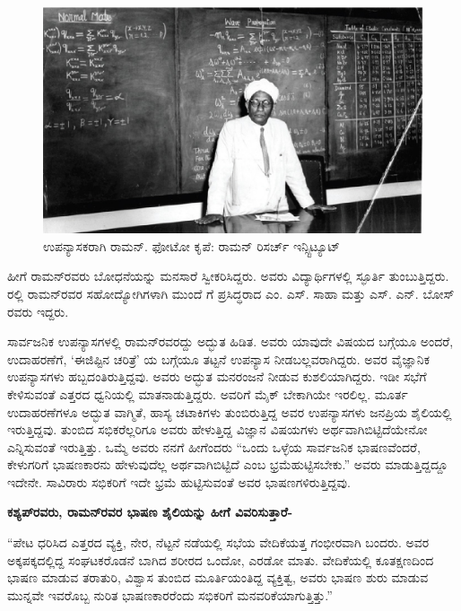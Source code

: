 \begin{figure}
\includegraphics{"images/14.jpg"}
\caption{ಉಪನ್ಯಾಸಕರಾಗಿ ರಾಮನ್. ಫೋಟೋ ಕೃಪೆ: ರಾಮನ್‌ ರಿಸರ್ಚ್ ಇನ್ಸ್ಟಿಟ್ಯೂಟ್}
\end{figure}

ಹೀಗೆ ರಾಮನ್‍ರವರು ಬೋಧನೆಯನ್ನು ಮನಸಾರೆ ಸ್ವೀಕರಿಸಿದ್ದರು. ಅವರು ವಿದ್ಯಾರ್ಥಿಗಳಲ್ಲಿ ಸ್ಫೂರ್ತಿ ತುಂಬುತ್ತಿದ್ದರು. ರಲ್ಲಿ ರಾಮನ್‍ರವರ ಸಹೋದ್ಯೋಗಿಗಳಾಗಿ ಮುಂದೆ  ಗೆ ಪ್ರಸಿದ್ಧರಾದ ಎಂ. ಎಸ್. ಸಾಹಾ ಮತ್ತು ಎಸ್. ಎನ್. ಬೋಸ್ ರವರು ಇದ್ದರು.



ಸಾರ್ವಜನಿಕ ಉಪನ್ಯಾಸಗಳಲ್ಲಿ ರಾಮನ್‍ರವರದ್ದು ಅದ್ಭುತ ಹಿಡಿತ. ಅವರು ಯಾವುದೇ ವಿಷಯದ ಬಗ್ಗೆಯೂ ಅಂದರೆ, ಉದಾಹರಣೆಗೆ, ‘ಈಜಿಪ್ಟಿನ ಚರಿತ್ರೆ’ ಯ ಬಗ್ಗೆಯೂ ತಟ್ಟನೆ ಉಪನ್ಯಾಸ ನೀಡಬಲ್ಲವರಾಗಿದ್ದರು. ಅವರ ವೈಜ್ಞಾನಿಕ ಉಪನ್ಯಾಸಗಳು ಹಬ್ಬದಂತಿರುತ್ತಿದ್ದವು. ಅವರು ಅದ್ಭುತ ಮನರಂಜನೆ ನೀಡುವ ಕುಶಲಿಯಾಗಿದ್ದರು. ಇಡೀ ಸಭೆಗೆ ಕೇಳಿಸುವಂತೆ ಎತ್ತರದ ಧ್ವನಿಯಲ್ಲಿ ಮಾತನಾಡುತ್ತಿದ್ದರು. ಅವರಿಗೆ ಮೈಕ್ ಬೇಕಾಗಿಯೇ ಇರಲಿಲ್ಲ. ಮೂರ್ತ ಉದಾಹರಣೆಗಳೂ ಅದ್ಭುತ ವಾಗ್ಮಿತೆ, ಹಾಸ್ಯ ಚಟಾಕಿಗಳು ತುಂಬಿರುತ್ತಿದ್ದ ಅವರ ಉಪನ್ಯಾಸಗಳು ಜನಪ್ರಿಯ ಶೈಲಿಯಲ್ಲಿ ಇರುತ್ತಿದ್ದವು. ತುಂಬಿದ ಸಭಿಕರೆಲ್ಲರಿಗೂ ಅವರು ಹೇಳುತ್ತಿದ್ದ ವಿಜ್ಞಾನ ವಿಷಯಗಳು ಅರ್ಥವಾಗಿಬಿಟ್ಟಿದೆಯೇನೋ ಎನ್ನಿಸುವಂತೆ ಇರುತ್ತಿತ್ತು. ಒಮ್ಮೆ ಅವರು ನನಗೆ ಹೀಗೆಂದರು “ಒಂದು ಒಳ್ಳೆಯ ಸಾರ್ವಜನಿಕ ಭಾಷಣವೆಂದರೆ, ಕೇಳುಗರಿಗೆ ಭಾಷಣಕಾರನು ಹೇಳುವುದೆಲ್ಲ ಅರ್ಥವಾಗಿಬಿಟ್ಟಿದೆ ಎಂಬ ಭ್ರಮೆಹುಟ್ಟಿಸಬೇಕು.” ಅವರು ಮಾಡುತ್ತಿದ್ದದ್ದೂ ಇದೇನೇ. ಸಾವಿರಾರು ಸಭಿಕರಿಗೆ ಇದೇ ಭ್ರಮೆ ಹುಟ್ಟಿಸುವಂತೆ ಅವರ ಭಾಷಣಗಳಿರುತ್ತಿದ್ದವು.

\textbf{ಕಶ್ಯಪ್‍ರವರು, ರಾಮನ್‍ರವರ ಭಾಷಣ ಶೈಲಿಯನ್ನು ಹೀಗೆ ವಿವರಿಸುತ್ತಾರೆ-}

“ಪೇಟ ಧರಿಸಿದ ಎತ್ತರದ ವ್ಯಕ್ತಿ, ನೇರ, ನೆಟ್ಟನೆ ನಡೆಯಲ್ಲಿ ಸಭೆಯ ವೇದಿಕೆಯತ್ತ ಗಂಭೀರವಾಗಿ ಬಂದರು. ಅವರ ಅಕ್ಕಪಕ್ಕದಲ್ಲಿದ್ದ ಸಂಘಟಕರೊಡನೆ ಬಾಗಿದ ಶರೀರದ ಒಂದೋ, ಎರಡೋ ಮಾತು. ವೇದಿಕೆಯಲ್ಲಿ ಕೂತಕ್ಷಣದಿಂದ ಭಾಷಣ ಮಾಡುವ ತರಾತುರಿ, ವಿಶ್ವಾಸ ತುಂಬಿದ ಮೂರ್ತಿಯಂತಿದ್ದ ವ್ಯಕ್ತಿತ್ವ, ಅವರು ಭಾಷಣ ಶುರು ಮಾಡುವ ಮುನ್ನವೇ ಇವರೊಬ್ಬ ನುರಿತ ಭಾಷಣಕಾರರೆಂದು ಸಭಿಕರಿಗೆ ಮನವರಿಕೆಯಾಗುತ್ತಿತ್ತು.”

